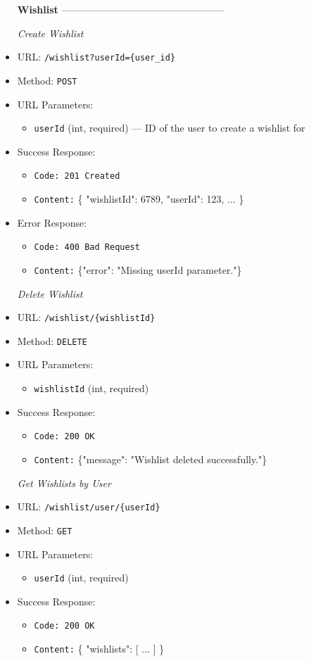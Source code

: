 \begin{itemize}
\item[\textbf{Wishlist}] --------------------------------------------------


\item[\textit{Create Wishlist}] 
\item URL: \texttt{/wishlist?userId=\{user\_id\}}  
\item Method: \texttt{POST}  
\item URL Parameters:
\begin{itemize}
  \item \texttt{userId} (int, required) — ID of the user to create a wishlist for
\end{itemize}
\item Success Response:
\begin{itemize}
  \item \texttt{Code: 201 Created}  
  \item \texttt{Content:} \{ "wishlistId": 6789, "userId": 123, ... \}
\end{itemize}
\item Error Response:
\begin{itemize}
  \item \texttt{Code: 400 Bad Request}  
  \item \texttt{Content:} \{"error": "Missing userId parameter."\}
\end{itemize}

\item[\textit{Delete Wishlist}] 
\item URL: \texttt{/wishlist/\{wishlistId\}}  
\item Method: \texttt{DELETE}  
\item URL Parameters:
\begin{itemize}
  \item \texttt{wishlistId} (int, required)
\end{itemize}
\item Success Response:
\begin{itemize}
  \item \texttt{Code: 200 OK}  
  \item \texttt{Content:} \{"message": "Wishlist deleted successfully."\}
\end{itemize}

\item[\textit{Get Wishlists by User}] 
\item URL: \texttt{/wishlist/user/\{userId\}}  
\item Method: \texttt{GET}  
\item URL Parameters:
\begin{itemize}
  \item \texttt{userId} (int, required)
\end{itemize}
\item Success Response:
\begin{itemize}
  \item \texttt{Code: 200 OK}  
  \item \texttt{Content:} \{ "wishlists": [ ... ] \}
\end{itemize}


\end{itemize}
